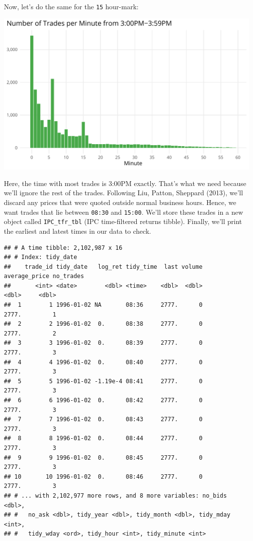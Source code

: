 \documentclass[]{elsarticle} %
\makeatletter
\def\maxwidth{\ifdim\Gin@nat@width>\linewidth\linewidth
\else\Gin@nat@width\fi}
\let\Oldincludegraphics\includegraphics
\renewcommand{\includegraphics}[1]{\Oldincludegraphics[width=\maxwidth]{#1}}
\makeatother
\begin{document}
Now, let's do the same for the \texttt{15} hour-mark:

\includegraphics{01-Data-Prep-Elsevier_files/figure-latex/unnamed-chunk-15-1.pdf}

Here, the time with most trades is 3:00PM exactly. That's what we need
because we'll ignore the rest of the trades. Following Liu, Patton,
Sheppard (2013), we'll discard any prices that were quoted outside
normal business hours. Hence, we want trades that lie between
\texttt{08:30} and \texttt{15:00}. We'll store these trades in a new
object called \texttt{IPC\_tfr\_tbl} (IPC time-filtered returns tibble).
Finally, we'll print the earliest and latest times in our data to check.

\begin{verbatim}
## # A time tibble: 2,102,987 x 16
## # Index: tidy_date
##    trade_id tidy_date   log_ret tidy_time  last volume average_price no_trades
##       <int> <date>        <dbl> <time>    <dbl>  <dbl>         <dbl>     <dbl>
##  1        1 1996-01-02 NA       08:36     2777.      0         2777.         1
##  2        2 1996-01-02  0.      08:38     2777.      0         2777.         2
##  3        3 1996-01-02  0.      08:39     2777.      0         2777.         3
##  4        4 1996-01-02  0.      08:40     2777.      0         2777.         3
##  5        5 1996-01-02 -1.19e-4 08:41     2777.      0         2777.         3
##  6        6 1996-01-02  0.      08:42     2777.      0         2777.         3
##  7        7 1996-01-02  0.      08:43     2777.      0         2777.         3
##  8        8 1996-01-02  0.      08:44     2777.      0         2777.         3
##  9        9 1996-01-02  0.      08:45     2777.      0         2777.         3
## 10       10 1996-01-02  0.      08:46     2777.      0         2777.         3
## # ... with 2,102,977 more rows, and 8 more variables: no_bids <dbl>,
## #   no_ask <dbl>, tidy_year <dbl>, tidy_month <dbl>, tidy_mday <int>,
## #   tidy_wday <ord>, tidy_hour <int>, tidy_minute <int>
\end{verbatim}
\end{document}
